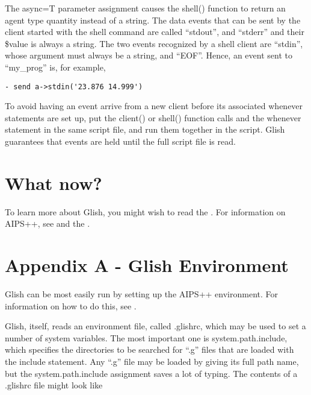 The async=T parameter assignment causes the shell() function to return an
agent type quantity instead of a string.  The data events that can be sent
by the client started with the shell command are called ``stdout'', 
and ``stderr'' and their \$value is always a string.  The two 
events recognized by a shell client are
``stdin'', whose argument must always be a string, and ``EOF''.  Hence, an
event sent to ``my\_prog'' is, for example,

\begin{verbatim}
- send a->stdin('23.876 14.999')
\end{verbatim}

    To avoid having an event arrive from a new client before its associated
whenever statements are set up, put the client() or shell() function calls
and the whenever statement in the same script file, and run them together in
the script.  Glish guarantees that events are held until the full script
file is read.

\section{What now?}

To learn more about Glish, you might wish to read the
. For information on AIPS++,
see  and the
.

\section{Appendix A - Glish Environment}

Glish can be most easily run by setting up the AIPS++ environment.
For information on how to do this, see .

    Glish, itself, reads an environment file, called .glishrc, which may be
used to set a number of system variables.  The most important one is
system.path.include, which specifies the directories to be searched for
``.g'' files that are loaded with the include statement.  Any ``.g'' file may
be loaded by giving its full path name, but the system.path.include
assignment saves a lot of typing.  The contents of a .glishrc file might
look like

